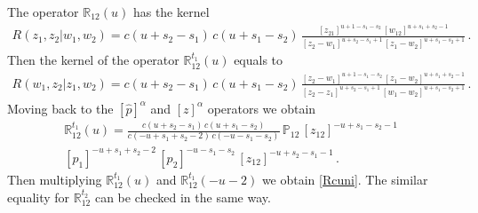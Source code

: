 \documentclass[a4paper,11pt]{article}
\numberwithin{equation}{section}
\begin{document}
The operator $\mathbb{R}_{12}(u)$ has the kernel 
\begin{align*}
	R(z_1,z_2|w_1,w_2) = c(u+s_2-s_1)\,c(u+s_1-s_2)\,
	\frac{[z_{21}]^{u+1-s_1-s_2}\,[w_{12}]^{u+s_1+s_2-1}}{[z_2-w_1]^{u+s_2-s_1+1}\,[z_1-w_2]^{u+s_1-s_2+1}} \,.
\end{align*}	
Then the kernel of the operator $\mathbb{R}_{12}^{t_1}(u)$ equals to 
	\begin{align*}
	R(w_1,z_2|z_1,w_2) = c(u+s_2-s_1)\,c(u+s_1-s_2)\,
	\frac{[z_2-w_1]^{u+1-s_1-s_2}\,[z_1-w_2]^{u+s_1+s_2-1}}{[z_2-z_1]^{u+s_2-s_1+1}\,[w_1-w_2]^{u+s_1-s_2+1}} \,.
\end{align*}	
Moving back to the $[\hat{p}]^\alpha$ and $[z]^\alpha$ operators we obtain
\begin{align*}
	\mathbb{R}_{12}^{t_1}(u) = \frac{c(u+s_2-s_1)\,c(u+s_1-s_2)}{c(-u+s_1+s_2-2)\,c(-u-s_1-s_2)}\,\mathbb{P}_{12}\,
	[z_{12}]^{-u+s_1-s_2-1} \\ [p_1]^{-u+s_1+s_2-2}\,[p_2]^{-u-s_1-s_2}\,[z_{12}]^{-u+s_2-s_1-1} \,.
\end{align*}	
Then multiplying $\mathbb{R}_{12}^{t_1}(u)$ and $\mathbb{R}_{12}^{t_1}(-u-2)$ we obtain \eqref{Rcuni}.
The similar equality for $\mathbb{R}_{12}^{t_2}$ can be checked in the same way.
\end{document}
